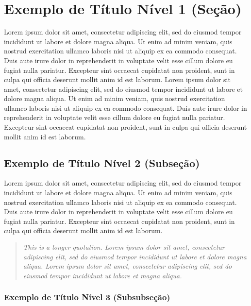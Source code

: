 
\section{Exemplo de Título Nível 1 (Seção)}
Lorem ipsum dolor sit amet, consectetur adipiscing elit, sed do eiusmod tempor incididunt ut labore et dolore magna aliqua. Ut enim ad minim veniam, quis nostrud exercitation ullamco laboris nisi ut aliquip ex ea commodo consequat. Duis aute irure dolor in reprehenderit in voluptate velit esse cillum dolore eu fugiat nulla pariatur. Excepteur sint occaecat cupidatat non proident, sunt in culpa qui officia deserunt mollit anim id est laborum. Lorem ipsum dolor sit amet, consectetur adipiscing elit, sed do eiusmod tempor incididunt ut labore et dolore magna aliqua. Ut enim ad minim veniam, quis nostrud exercitation ullamco laboris nisi ut aliquip ex ea commodo consequat. Duis aute irure dolor in reprehenderit in voluptate velit esse cillum dolore eu fugiat nulla pariatur. Excepteur sint occaecat cupidatat non proident, sunt in culpa qui officia deserunt mollit anim id est laborum.

\subsection{Exemplo de Título Nível 2 (Subseção)}

Lorem ipsum dolor sit amet, consectetur adipiscing elit, sed do eiusmod tempor incididunt ut labore et dolore magna aliqua. Ut enim ad minim veniam, quis nostrud exercitation ullamco laboris nisi ut aliquip ex ea commodo consequat. Duis aute irure dolor in reprehenderit in voluptate velit esse cillum dolore eu fugiat nulla pariatur. Excepteur sint occaecat cupidatat non proident, sunt in culpa qui officia deserunt mollit anim id est laborum.

\begin{quotation}
\textit{This is a longer quotation. Lorem ipsum dolor sit amet, consectetur adipiscing elit, sed do eiusmod tempor incididunt ut labore et dolore magna aliqua. Lorem ipsum dolor sit amet, consectetur adipiscing elit, sed do eiusmod tempor incididunt ut labore et magna aliqua. 
}\end{quotation} 

\subsubsection{Exemplo de Título Nível 3 (Subsubseção)}

